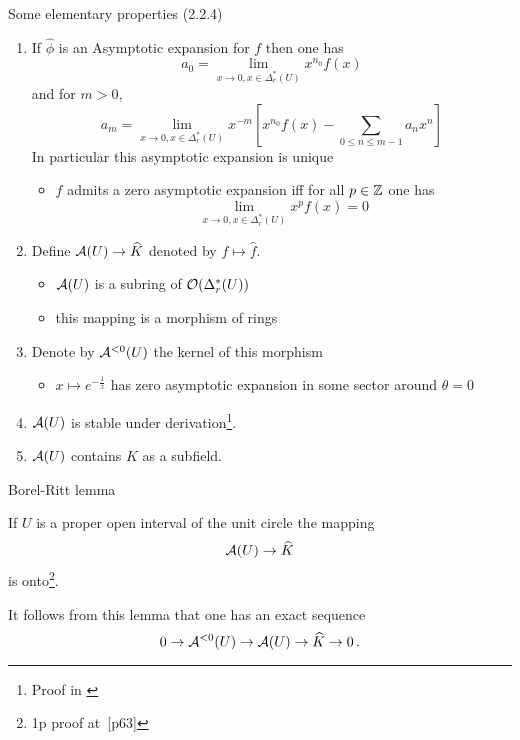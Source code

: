 \begin{frame}{Some elementary properties (2.2.4)}
  \begin{enumerate}
    \item If $\hat\phi$ is an Asymptotic expansion for $f$ then one has
      \[
        a_0=\lim_{x\to 0,x\in\Delta_r^*(U)}x^{n_0}f(x)
      \]
      and for $m>0$,
      \[
        a_m=\lim_{x\to 0,x\in\Delta_r^*(U)}x^{-m}
          \left[x^{n_0}f(x)-\sum_{0\leq n\leq m-1}a_nx^n\right]
      \]
      In particular this asymptotic expansion is unique
      \begin{itemize}
        \item $f$ admits a zero asymptotic expansion iff for all $p\in\mathbb{Z}$
          one has
          \[
            \lim_{x\to 0,x\in\Delta_r^*(U)}x^pf(x)=0
          \]
      \end{itemize}
    \item
      Define $\mathcal{A}(U)\to \widehat K$ denoted by $f\mapsto \hat{f}$.
      \begin{itemize}
        \item $\mathcal{A}(U)$ is a subring of $\mathcal{O}(\Delta_r^*(U))$
        \item this mapping is a morphism of rings
      \end{itemize}
    \item Denote by $\mathcal{A}^{<0}(U)$ the kernel of this morphism
      \begin{itemize}
        \item $x\mapsto e^{-\frac{1}{x}}$ has zero asymptotic expansion in
          some sector around $\theta=0$
      \end{itemize}
    \item $\mathcal{A}(U)$ is stable under derivation\footnote{Proof in
      \cite{sabbah_cimpa90}}.
    \item $\mathcal{A}(U)$ contains $K$ as a subfield.
  \end{enumerate}
\end{frame}

\begin{frame}{Borel-Ritt lemma}
  \begin{lem}[2.2.5]
  If $U$ is a proper open interval of the unit circle the mapping
  \[
  \mathcal{A}(U)\to\widehat{K}
  \]
  is onto\footnote{1p proof at~\cite{sabbah_cimpa90}[p63]}.
  \end{lem}

  It follows from this lemma that one has an exact sequence
  \[
    0 \to \mathcal{A}^{<0}(U) \to \mathcal{A}(U) \to \widehat{K} \to 0 \,.
  \]
\end{frame}
